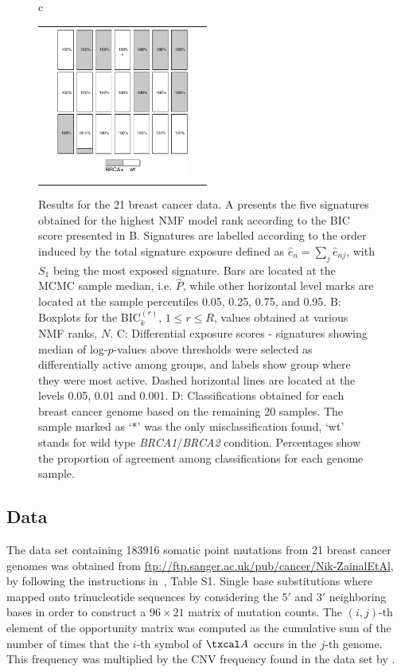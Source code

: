 \documentclass{bioinfo}
\begin{document}
\begin{figure}[htb!]
\begin{tabular}{c}
\begin{tabular}{ccc}
   & 
   \includegraphics[width=4.5cm]{figs/Classific}
 \end{tabular}
 \end{tabular}
 \caption{\textrm{%
    Results for the 21 breast cancer data. A presents the five
    signatures obtained for the highest NMF model rank according to the
    BIC score presented in B. Signatures are labelled according to the
    order induced by the total signature exposure defined as $\hat e_n =
    \sum_{j} \hat e_{nj}$, with $S_1$ being the most exposed
    signature. Bars are located at the MCMC sample median,
    i.e. $\widehat P$, while other horizontal level marks are located
    at the sample percentiles 0.05, 0.25, 0.75, and 0.95.
    B: Boxplots for the BIC$^{(r)}_k$, $1 \leq r \leq R$, values 
    obtained at various NMF ranks, $N$. C: Differential exposure
    scores - signatures
    showing median of log-$p$-values above thresholds were selected as
    differentially active among groups, and labels show group where they
    were most active.  Dashed horizontal lines are located at 
    the levels 0.05, 0.01 and 0.001. D: Classifications
    obtained for each breast cancer genome based on the remaining 20
    samples. The sample marked as `*' was the only
    misclassification found, `wt' stands for wild type \emph{BRCA1}/\emph{BRCA2}
    condition. Percentages show the proportion of agreement among
    classifications for each genome sample.
  }
 }\label{fig:bcancer} 
\end{figure}
\subsection{Data} The data set containing 183916 somatic point
mutations from 21 breast cancer genomes was obtained from
\url{ftp://ftp.sanger.ac.uk/pub/cancer/Nik-ZainalEtAl}, by
following the instructions in~\cite{NCell}, Table S1. Single base 
substitutions where mapped onto trinucleotide sequences by considering
the $5'$ and $3'$ neighboring bases in order to construct a $96\times
21$ matrix of mutation counts. The $(i,j)$-th element of the
opportunity matrix was computed as the cumulative sum of the number of
times that the $i$-th symbol of $\txcal A$ occurs in the $j$-th
genome. This frequency was multiplied by the CNV frequency
found in the data set by \cite{NCell}.
\end{document}
